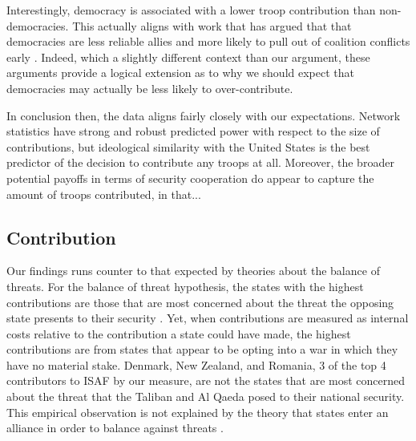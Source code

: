 \documentclass[12pt,letterpaper]{article}
\begin{document}
		Interestingly, democracy is associated with a lower troop contribution than non-democracies. This actually aligns with work that has argued that that democracies are less reliable allies and more likely to pull out of coalition conflicts early \citep{massie_whydemocraticallies_2016, gartzke_whydemocraciesmay_2004}. Indeed, which a slightly different context than our argument, these arguments provide a logical extension as to why we should expect that democracies may actually be less likely to over-contribute.

		In conclusion then, the data aligns fairly closely with our expectations. Network statistics have strong and robust predicted power with respect to the size of contributions, but ideological similarity with the United States is the best predictor of the decision to contribute any troops at all. Moreover, the broader potential payoffs in terms of security cooperation do appear to capture the amount of troops contributed, in that...


	\subsection{Contribution}
		Our findings runs counter to that expected by theories about the balance of threats. For the balance of threat hypothesis, the states with the highest contributions are those that are most concerned about the threat the opposing state presents to their security \citep{haesebrouck_democraticparticipationair_2016}. Yet, when contributions are measured as internal costs relative to the contribution a state could have made, the highest contributions are from states that appear to be opting into a war in which they have no material stake. Denmark, New Zealand, and Romania, 3 of the top 4 contributors to ISAF by our measure, are not the states that are most concerned about the threat that the Taliban and Al Qaeda posed to their national security. This empirical observation is not explained by the theory that states enter an alliance in order to balance against threats \citep{walt_originsalliance_1987}.
\end{document}
